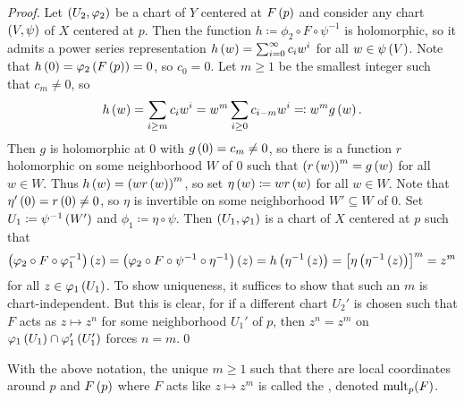 \documentclass[../Moduli_Spaces_of_Riemann_Surfaces.tex]{subfiles}
\begin{document}
    \begin{proof}
        Let $\left(U_2,\varphi_2\right)$ be a chart of $Y$ centered at $F\left(p\right)$ and consider any chart $\left(V,\psi\right)$ of $X$ centered at $p$. Then the function $h\coloneqq\phi_2\circ F\circ\psi^{-1}$ is holomorphic, so it admits a power series representation $h\left(w\right)=\sum_{i=0}^{\infty}c_iw^i$ for all $w\in\psi\left(V\right)$. Note that $h\left(0\right)=\varphi_2\left(F\left(p\right)\right)=0$, so $c_0=0$. Let $m\geq1$ be the smallest integer such that $c_m\neq0$, so
        \begin{equation*}
            h\left(w\right)=\sum_{i\geq m}c_iw^i=w^m\sum_{i\geq0}c_{i-m}w^i\eqqcolon w^mg\left(w\right).
        \end{equation*}
        Then $g$ is holomorphic at $0$ with $g\left(0\right)=c_m\neq0$, so there is a function $r$ holomorphic on some neighborhood $W$ of $0$ such that $\left(r\left(w\right)\right)^m=g\left(w\right)$ for all $w\in W$. Thus $h\left(w\right)=\left(wr\left(w\right)\right)^m$, so set $\eta\left(w\right)\coloneqq wr\left(w\right)$ for all $w\in W$. Note that $\eta'\left(0\right)=r\left(0\right)\neq0$, so $\eta$ is invertible on some neighborhood $W'\subseteq W$ of $0$. Set $U_1\coloneqq\psi^{-1}\left(W'\right)$ and $\phi_1\coloneqq\eta\circ\psi$. Then $\left(U_1,\varphi_1\right)$ is a chart of $X$ centered at $p$ such that
        \begin{equation*}
            \left(\varphi_2\circ F\circ\varphi_1^{-1}\right)\left(z\right)=\left(\varphi_2\circ F\circ\psi^{-1}\circ\eta^{-1}\right)\left(z\right)=h\left(\eta^{-1}\left(z\right)\right)=\left[\eta\left(\eta^{-1}\left(z\right)\right)\right]^m=z^m
        \end{equation*}
        for all $z\in\varphi_1\left(U_1\right)$. To show uniqueness, it suffices to show that such an $m$ is chart-independent. But this is clear, for if a different chart $U_2'$ is chosen such that $F$ acts as $z\mapsto z^n$ for some neighborhood $U_1'$ of $p$, then $z^n=z^m$ on $\varphi_1\left(U_1\right)\cap\varphi_1'\left(U_1'\right)$ forces $n=m$.\qed
    \end{proof}
    \begin{definition}
        With the above notation, the unique $m\geq1$ such that there are local coordinates around $p$ and $F\left(p\right)$ where $F$ acts like $z\mapsto z^m$ is called the , denoted $\operatorname{mult}_p\!\left(F\right)$.
    \end{definition}
\end{document}
